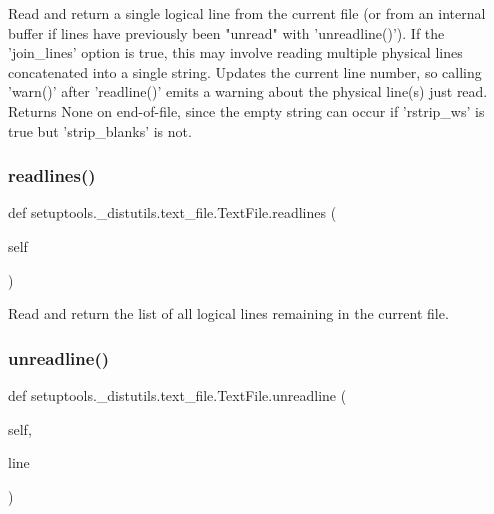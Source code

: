 \begin{DoxyVerb}Read and return a single logical line from the current file (or
   from an internal buffer if lines have previously been "unread"
   with 'unreadline()').  If the 'join_lines' option is true, this
   may involve reading multiple physical lines concatenated into a
   single string.  Updates the current line number, so calling
   'warn()' after 'readline()' emits a warning about the physical
   line(s) just read.  Returns None on end-of-file, since the empty
   string can occur if 'rstrip_ws' is true but 'strip_blanks' is
   not.\end{DoxyVerb}
 \mbox{\label{classsetuptools_1_1__distutils_1_1text__file_1_1TextFile_aa066754c670227f4eb2cfd024c7f0763}} 
\subsubsection{\texorpdfstring{readlines()}{readlines()}}
{\footnotesize\ttfamily def setuptools.\+\_\+distutils.\+text\+\_\+file.\+Text\+File.\+readlines (\begin{DoxyParamCaption}\item[{}]{self }\end{DoxyParamCaption})}

\begin{DoxyVerb}Read and return the list of all logical lines remaining in the
   current file.\end{DoxyVerb}
 \mbox{\label{classsetuptools_1_1__distutils_1_1text__file_1_1TextFile_aab875300ab8aedf894e6bf967aa5e943}} 
\subsubsection{\texorpdfstring{unreadline()}{unreadline()}}
{\footnotesize\ttfamily def setuptools.\+\_\+distutils.\+text\+\_\+file.\+Text\+File.\+unreadline (\begin{DoxyParamCaption}\item[{}]{self,  }\item[{}]{line }\end{DoxyParamCaption})}

